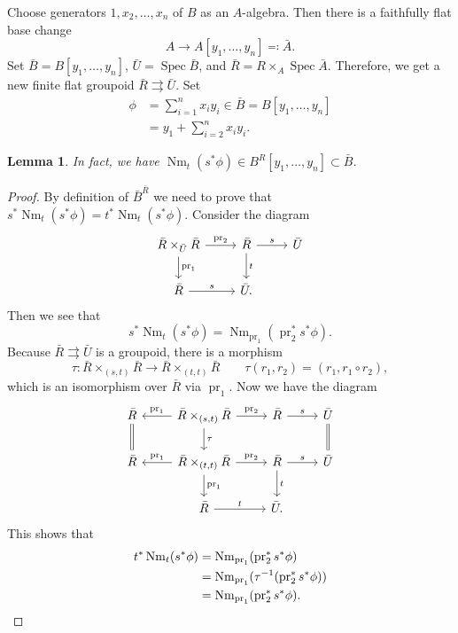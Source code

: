 \documentclass{amsart}
\newtheorem{lem}[thm]{Lemma}
\theoremstyle{definition}
\theoremstyle{remark}
\theoremstyle{plain}
\theoremstyle{definition}
\theoremstyle{remark}
\newcommand{\on}[1]{\operatorname{#1}}
\newcommand{\1}{\mathbf{1}}
\newcommand{\2}{\mathbf{2}}
\newcommand{\3}{\mathbf{3}}
\DeclareMathOperator{\Spec}{Spec}
\begin{document}
    Choose generators \(1, x_2, \ldots, x_n\) of \(B\) as an \(A\)-algebra. Then there is a faithfully flat base change
    \[ A \to A [y_1, \ldots, y_n] \eqqcolon \bar{A}. \]
    Set \(\bar{B} = B[y_1, \ldots, y_n]\), \(\bar{U} = \Spec \bar{B}\), and \(\bar{R} = R \times_A \Spec \bar{A}\). Therefore, we get a new finite flat groupoid \(\bar{R} \rightrightarrows \bar{U}\). Set
    \begin{align*} 
        \phi &= \sum_{i=1}^n x_i y_i \in \bar{B} = B[y_1, \ldots, y_n] \\
        &= y_1 + \sum_{i=2}^n x_i y_i.
    \end{align*}
    \begin{lem}
        In fact, we have \(\on{Nm}_t(s^* \phi) \in B^R[y_1, \ldots, y_n] \subset \bar{B}\).
    \end{lem}
    \begin{proof}
        By definition of \(\bar{B}^{\bar{R}}\) we need to prove that \(s^* \on{Nm}_t(s^* \phi) = t^* \on{Nm}_t(s^* \phi)\). Consider the diagram
        \begin{equation*}
        \begin{tikzcd}
            \bar{R} \times_{\bar{U}} \bar{R} \ar{r}{\on{pr}_2} \ar{d}{\on{pr}_1} & \bar{R} \ar{d}{t} \ar{r}{s} & \bar{U} \\
            \bar{R} \ar{r}{s} & \bar{U}.
        \end{tikzcd}
        \end{equation*}
        Then we see that
        \[ s^* \on{Nm}_t(s^* \phi) = \on{Nm}_{\on{pr}_1} (\on{pr}_2^* s^* \phi). \]
        Because \(\bar{R} \rightrightarrows \bar{U}\) is a groupoid, there is a morphism 
        \[ \tau \colon \bar{R} \times_{(s,t)} \bar{R} \to \bar{R} \times_{(t,t)} \bar{R} \qquad \tau(r_1, r_2) = (r_1, r_1 \circ r_2), \]
        which is an isomorphism over \(\bar{R}\) via \(\on{pr}_1\). Now we have the diagram
        \begin{equation*}
        \begin{tikzcd}
            \bar{R} \ar[equals]{d} & \bar{R} \times_{(s,t)} \bar{R} \ar{d}{\tau} \ar{l}[swap]{\on{pr}_1} \ar{r}{\on{pr}_2} & \bar{R} \ar{r}{s} & \bar{U} \ar[equals]{d} \\
            \bar{R} & \bar{R} \times_{(t,t)} \bar{R} \ar{d}{\on{pr}_1} \ar{l}[swap]{\on{pr}_1} \ar{r}{\on{pr}_2} & \bar{R} \ar{d}{t} \ar{r}{s} & \bar{U} \\
            & \bar{R} \ar{r}{t} & \bar{U}.
        \end{tikzcd}
        \end{equation*}
        This shows that
        \begin{align*}
            t^* \on{Nm}_t (s^* \phi) &= \on{Nm}_{\on{pr}_1} (\on{pr}_2^* s^* \phi) \\
            &= \on{Nm}_{\on{pr}_1} (\tau^{-1} (\on{pr}_2^* s^* \phi)) \\
            &= \on{Nm}_{\on{pr}_1} (\on{pr}_2^* s^* \phi). \qedhere
        \end{align*}
    \end{proof}
\end{document}

